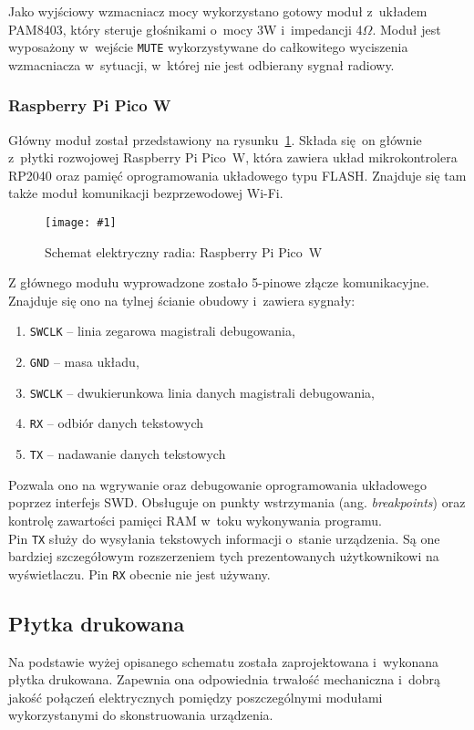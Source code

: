 \documentclass[polish]{aghengthesis}
\newcommand{\imgint}[4]{
	\begin{figure}[{#4}]
		\centering
		\texttt{[image: \#1]}
		\caption{#2}
		\label{#1}
	\end{figure}
}
\newcommand{\imgh}[3]{\imgint{#1}{#2}{#3}{H}}
\begin{document}
				Jako wyjściowy wzmacniacz mocy wykorzystano gotowy moduł z~układem PAM8403\textsuperscript{\cite{hw_amp}}, który steruje głośnikami o~mocy 3W i~impedancji 4$\Omega$. Moduł jest wyposażony w~wejście \lstinline|MUTE| wykorzystywane do całkowitego wyciszenia wzmacniacza w~sytuacji, w~której nie jest odbierany sygnał radiowy.
				
							
			\subsubsection{Raspberry Pi Pico W}
				Główny moduł został przedstawiony na rysunku~\ref{3/hw_kicad_sch_picow}.
			 	Składa się on głównie z~płytki rozwojowej Raspberry Pi Pico~W, która zawiera układ mikrokontrolera RP2040 oraz pamięć oprogramowania układowego typu FLASH. Znajduje się tam także moduł komunikacji bezprzewodowej Wi-Fi.
				\imgh{3/hw_kicad_sch_picow}{Schemat elektryczny radia: Raspberry Pi Pico~W}{0.65}
				
				Z głównego modułu wyprowadzone zostało 5-pinowe złącze komunikacyjne. Znajduje się ono na tylnej ścianie obudowy i~zawiera sygnały:
				\begin{enumerate}
					\setlength{\itemsep}{0cm}
					\item \lstinline|SWCLK| -- linia zegarowa magistrali debugowania,
					\item \lstinline|GND| -- masa układu,
					\item \lstinline|SWCLK| -- dwukierunkowa linia danych magistrali debugowania,
					\item \lstinline|RX| -- odbiór danych tekstowych
					\item \lstinline|TX| -- nadawanie danych tekstowych
				\end{enumerate}
				
				Pozwala ono na wgrywanie oraz debugowanie oprogramowania układowego poprzez interfejs SWD\textsuperscript{\cite{swd}}. Obsługuje on punkty wstrzymania (ang. \textit{breakpoints}) oraz kontrolę zawartości pamięci RAM w~toku wykonywania programu.
				$ $\\
				
				Pin \lstinline|TX| służy do wysyłania tekstowych informacji o~stanie urządzenia. Są one bardziej szczegółowym rozszerzeniem tych prezentowanych użytkownikowi na wyświetlaczu. Pin \lstinline|RX| obecnie nie jest używany.
				
		\subsection{Płytka drukowana}
			Na podstawie wyżej opisanego schematu została zaprojektowana i~wykonana płytka drukowana.
			Zapewnia ona odpowiednia trwałość mechaniczna i~dobrą jakość połączeń elektrycznych pomiędzy poszczególnymi modułami wykorzystanymi do skonstruowania urządzenia.
			$ $\\
			
\end{document}
